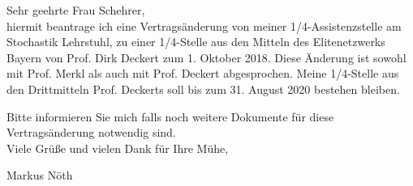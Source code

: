\documentclass[a4paper,12pt]{article}
\begin{document}
Sehr geehrte Frau Schehrer,\\

hiermit beantrage ich eine Vertragsänderung von meiner 1/4-Assistenzstelle am Stochastik Lehrstuhl, zu einer 1/4-Stelle aus den Mitteln des Elitenetzwerks Bayern von Prof. Dirk Deckert zum 1. Oktober 2018. Diese Änderung ist sowohl mit Prof. Merkl als auch mit Prof. Deckert abgesprochen. Meine 1/4-Stelle aus den Drittmitteln Prof. Deckerts soll bis zum 31. August 2020 bestehen bleiben.

Bitte informieren Sie mich falls noch weitere Dokumente für diese Vertragsänderung notwendig sind.\\

Viele Grüße und vielen Dank für Ihre Mühe,

Markus Nöth
\end{document}
